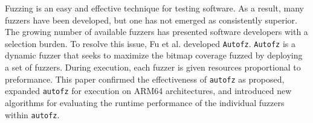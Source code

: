 \begin{Abstract}
Fuzzing is an easy and effective technique for testing software. As a result, 
many fuzzers have been developed, but one has not emerged as consistently superior. 
The growing number of available fuzzers has presented software developers with a 
selection burden.  To resolve this issue, Fu et al. developed \texttt{Autofz}. 
\texttt{Autofz} is a dynamic fuzzer that seeks to maximize the bitmap coverage fuzzed
 by deploying a set of fuzzers. During execution, each fuzzer is given resources 
 proportional to preformance. This paper confirmed the effectiveness of \texttt{autofz} 
 as proposed, expanded \texttt{autofz} for execution on ARM64 architectures, and introduced new
 algorithms for evaluating the runtime performance of the individual fuzzers within 
 \texttt{autofz}.
\end{Abstract}